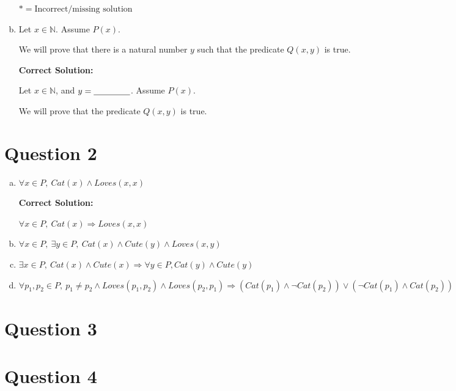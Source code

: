 \documentclass[12pt]{article}
\begin{document}
\begin{enumerate}[a.]
    $* = \text{Incorrect/missing solution}$

    \item

    Let $x \in \mathbb{N}$. Assume $P(x)$.

    \bigskip

    We will prove that there is a natural number $y$ such that the predicate
    $Q(x,y)$ is true.

    \bigskip

    \textbf{Correct Solution:}

    Let $x \in \mathbb{N}$, and $y = \underline{\hspace{1.5cm}}$. Assume $P(x)$.

    \bigskip

    We will prove that the predicate $Q(x,y)$ is true.

\end{enumerate}

\section*{Question 2}
\begin{enumerate}[a.]
    \item

    $\forall x \in P,\:Cat(x) \land Loves(x,x)$

    \bigskip

    \textbf{Correct Solution:}

    $\forall x \in P,\:Cat(x) \Rightarrow Loves(x,x)$

    \item

    $\forall x \in P,\: \exists y \in P,\: Cat(x) \land Cute(y) \land Loves(x,y)$

    \item

    $\exists x \in P,\: Cat(x) \land Cute(x) \Rightarrow \forall y \in P, Cat(y)
    \land Cute(y)$

    \item

    $\forall p_1,p_2 \in P,\:p_1 \neq p_2 \land Loves(p_1,p_2) \land Loves(p_2,p_1)
    \Rightarrow (Cat(p_1) \land \neg Cat(p_2)) \lor (\neg Cat(p_1) \land Cat(p_2))$

\end{enumerate}

\section*{Question 3}

\section*{Question 4}
\end{document}
